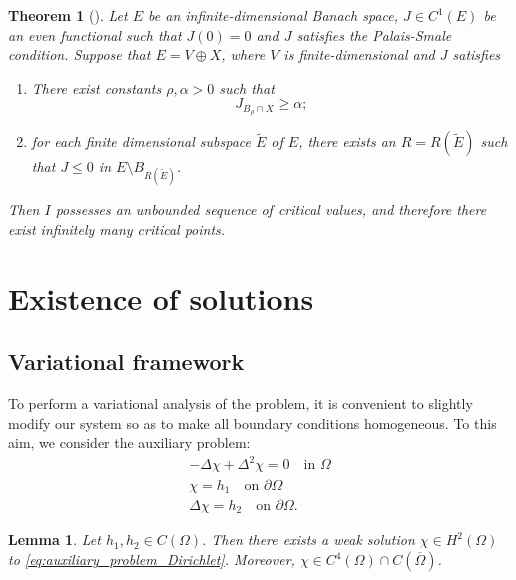 \documentclass[10pt,a4paper]{amsart}
\numberwithin{equation}{section}
\newtheorem{theorem}[theo]{Theorem}
\newtheorem{lemma}[theo]{Lemma}
\begin{document}
\begin{theorem}[{\cite[Theorem 9.12]{Rabinowitz1986}}]
 \label{thm:Mountain_Pass}
Let $E$ be an infinite-dimensional Banach space, $J \in C^1(E)$ be an even 
functional such that $J(0) = 0$ and $J$ satisfies the Palais-Smale condition. 
Suppose that $E = V \oplus X$, where $V$ is finite-dimensional and $J$ satisfies
\begin{enumerate}
 \item There exist constants $\rho, \alpha > 0$ such that
 \[
 J_{B_\rho \cap X} \geq \alpha;
 \]

 \item for each finite dimensional subspace $\widetilde E$ of $E$, there exists an $R = R(\widetilde E)$ such that $J \leq 0$ in $E \setminus B_{R(\widetilde E)}$.
 \end{enumerate}
Then $I$ possesses an unbounded sequence of critical values, and therefore there exist infinitely many critical points.
\end{theorem}

\section{Existence of solutions}
\label{sec:existence}
\subsection{Variational framework}

To perform a variational analysis of the problem, it is convenient to slightly 
modify our system so as to make all boundary conditions homogeneous. 
To this aim, we consider the auxiliary problem:
\begin{equation}
 \label{eq:auxiliary_problem_Dirichlet}
\begin{gathered}
 - \Delta \chi + \Delta^2 \chi  =  0  \quad \text{in } \Omega \\
 \chi  =  h_1  \quad \text{on } \partial\Omega \\
 \Delta \chi  =  h_2  \quad \text{on } \partial\Omega.
 \end{gathered}
\end{equation}

\begin{lemma}
 \label{lem:exitence_auxiliary_problem}
Let $h_1, h_2 \in C(\Omega)$. Then there exists a weak solution 
$\chi \in H^2(\Omega)$ to \eqref{eq:auxiliary_problem_Dirichlet}. 
Moreover, $\chi \in C^4(\Omega) \cap C(\overline \Omega)$.
\end{lemma}
\end{document}
